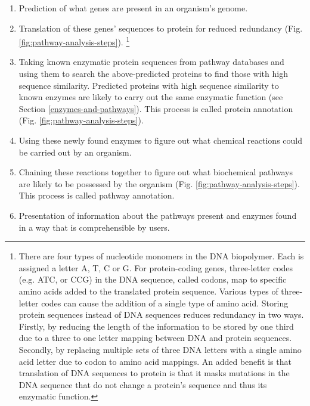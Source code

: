 \begin{enumerate}
\item Prediction of what genes are present in an organism's genome.
\item Translation of these genes' sequences to protein for reduced redundancy (Fig. \ref{fig:pathway-analysis-steps}). \footnote{There are four types of nucleotide monomers in the DNA biopolymer. Each is assigned a letter A, T, C or G. For protein-coding genes, three-letter codes (e.g. ATC, or CCG) in the DNA sequence, called codons, map to specific amino acids added to the translated protein sequence. Various types of three-letter codes can cause the addition of a single type of amino acid. Storing protein sequences instead of DNA sequences reduces redundancy in two ways. Firstly, by reducing the length of the information to be stored by one third due to a three to one letter mapping between DNA and protein sequences. Secondly, by replacing multiple sets of three DNA letters with a single amino acid letter due to codon to amino acid mappings. An added benefit is that translation of DNA sequences to protein is that it masks mutations in the DNA sequence that do not change a protein's sequence and thus its enzymatic function.} 
\item Taking known enzymatic protein sequences from pathway databases and using them to search the above-predicted proteins to find those with high sequence similarity. Predicted proteins with high sequence similarity to known enzymes are likely to carry out the same enzymatic function (see Section \ref{enzymes-and-pathways}). This process is called protein annotation (Fig. \ref{fig:pathway-analysis-steps}).
\item Using these newly found enzymes to figure out what chemical reactions could be carried out by an organism.
\item Chaining these reactions together to figure out what biochemical pathways are likely to be possessed by the organism (Fig. \ref{fig:pathway-analysis-steps}). This process is called pathway annotation.
\item Presentation of information about the pathways present and enzymes found in a way that is comprehensible by users.
\end{enumerate}

